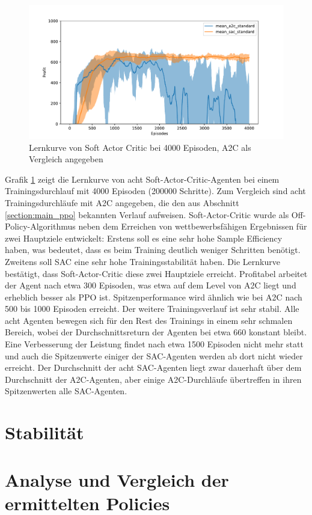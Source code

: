 \begin{figure}[htbp]
	\centering
	\includegraphics[width=\textwidth]{main/a2c_vs_sac.pdf}
	\caption{Lernkurve von Soft Actor Critic bei 4000 Episoden, A2C als Vergleich angegeben}
	\label{grafic:SACLearningCurve}
\end{figure}

Grafik \ref{grafic:SACLearningCurve} zeigt die Lernkurve von acht Soft-Actor-Critic-Agenten bei einem Trainingsdurchlauf mit 4000 Episoden (200000 Schritte).
Zum Vergleich sind acht Trainingsdurchläufe mit A2C angegeben, die den aus Abschnitt \ref{section:main_ppo} bekannten Verlauf aufweisen.
Soft-Actor-Critic wurde als Off-Policy-Algorithmus neben dem Erreichen von wettbewerbsfähigen Ergebnissen für zwei Hauptziele entwickelt:
Erstens soll es eine sehr hohe Sample Efficiency haben, was bedeutet, dass es beim Training deutlich weniger Schritten benötigt.
Zweitens soll SAC eine sehr hohe Trainingsstabilität haben.
Die Lernkurve bestätigt, dass Soft-Actor-Critic diese zwei Hauptziele erreicht.
Profitabel arbeitet der Agent nach etwa 300 Episoden, was etwa auf dem Level von A2C liegt und erheblich besser als PPO ist.
Spitzenperformance wird ähnlich wie bei A2C nach 500 bis 1000 Episoden erreicht.
Der weitere Trainingsverlauf ist sehr stabil.
Alle acht Agenten bewegen sich für den Rest des Trainings in einem sehr schmalen Bereich, wobei der Durchschnittsreturn der Agenten bei etwa 660 konstant bleibt.
Eine Verbesserung der Leistung findet nach etwa 1500 Episoden nicht mehr statt und auch die Spitzenwerte einiger der SAC-Agenten werden ab dort nicht wieder erreicht.
Der Durchschnitt der acht SAC-Agenten liegt zwar dauerhaft über dem Durchschnitt der A2C-Agenten, aber einige A2C-Durchläufe übertreffen in ihren Spitzenwerten alle SAC-Agenten.

\section{Stabilität}

\section{Analyse und Vergleich der ermittelten Policies}
